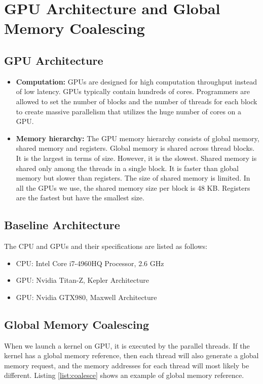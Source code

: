 \chapter{GPU Architecture and Global Memory Coalescing}\label{chap:architecture}

    \section{GPU Architecture}\label{sect:GPUArchitecure}
    \begin{itemize}
    \item   \textbf{Computation:} GPUs are designed for high computation throughput instead of 
            low latency. GPUs typically contain hundreds of cores. Programmers are allowed to
            set the number of blocks and the number of threads for each block to create massive
            parallelism that utilizes the huge number of cores on a GPU.
    \item   \textbf{Memory hierarchy:} The GPU memory hierarchy consists of global memory, shared memory 
            and registers. Global memory is shared across thread blocks. It is the largest 
            in terms of size. However, it is the slowest. Shared memory is shared only among 
            the threads in a single block. It is faster than global memory but slower than registers. 
            The size of shared memory is limited. In all the GPUs we use, the shared memory size per
            block is 48 KB. Registers are the fastest but have the smallest size.
    \end{itemize}

    \section{Baseline Architecture}\label{sect:baseline}
    The CPU and GPUs and their specifications are listed as follows:
\begin{itemize}
    \item CPU: Intel Core i7-4960HQ Processor, 2.6 GHz
    \item GPU: Nvidia Titan-Z, Kepler Architecture
    \item GPU: Nvidia GTX980, Maxwell Architecture
 \end{itemize} 
    

    \section{Global Memory Coalescing}\label{sect:coalesce}
    When we launch a kernel on GPU, it is executed by the parallel threads. 
    If the kernel has a global memory reference, then each thread will also generate a
    global memory request, and the memory addresses for each thread will most likely be 
    different. Listing \ref{list:coalesce} shows an example of global memory reference.

